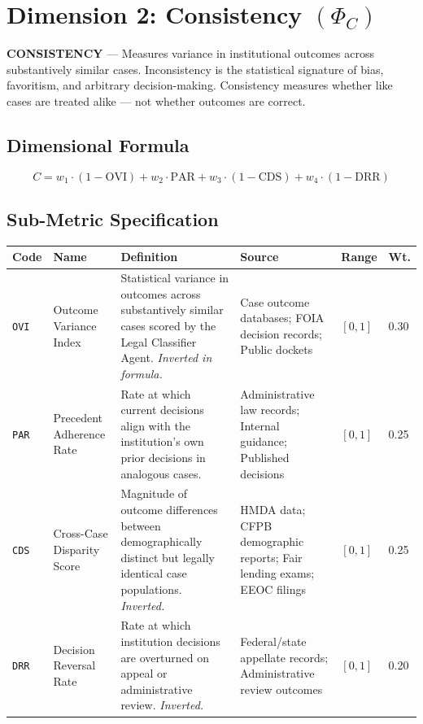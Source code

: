 \documentclass[a4paper,11pt]{article}
\begin{document}
	\newpage
	\section{Dimension 2: Consistency \texorpdfstring{$(\Phi_C)$}{}}
	
	\begin{dimensionbox}
		\textbf{\sffamily CONSISTENCY} — Measures variance in institutional outcomes across substantively similar cases. Inconsistency is the statistical signature of bias, favoritism, and arbitrary decision-making. Consistency measures whether like cases are treated alike — not whether outcomes are correct.
	\end{dimensionbox}
	
	\subsection{Dimensional Formula}
	
	\[
	C = w_1 \cdot (1 - \text{OVI}) + w_2 \cdot \text{PAR} + w_3 \cdot (1 - \text{CDS}) + w_4 \cdot (1 - \text{DRR})
	\]
	
	\subsection{Sub-Metric Specification}
	
	\begin{longtable}{L{1.1cm} L{1.9cm} L{4.5cm} L{3.5cm} C{1.1cm} C{1.1cm}}
		\toprule
		\color{white}\textbf{\sffamily Code} & \color{white}\textbf{\sffamily Name} & \color{white}\textbf{\sffamily Definition} & \color{white}\textbf{\sffamily Source} & \color{white}\textbf{\sffamily Range} & \color{white}\textbf{\sffamily Wt.} \\
		\midrule
		\endhead
		\texttt{OVI} & Outcome Variance Index & Statistical variance in outcomes across substantively similar cases scored by the Legal Classifier Agent. \textit{Inverted in formula.} & Case outcome databases; FOIA decision records; Public dockets & $[0,1]$ & 0.30 \\
		\midrule
		\texttt{PAR} & Precedent Adherence Rate & Rate at which current decisions align with the institution's own prior decisions in analogous cases. & Administrative law records; Internal guidance; Published decisions & $[0,1]$ & 0.25 \\
		\midrule
		\texttt{CDS} & Cross-Case Disparity Score & Magnitude of outcome differences between demographically distinct but legally identical case populations. \textit{Inverted.} & HMDA data; CFPB demographic reports; Fair lending exams; EEOC filings & $[0,1]$ & 0.25 \\
		\midrule
		\texttt{DRR} & Decision Reversal Rate & Rate at which institution decisions are overturned on appeal or administrative review. \textit{Inverted.} & Federal/state appellate records; Administrative review outcomes & $[0,1]$ & 0.20 \\
		\bottomrule
	\end{longtable}
	
\end{document}
